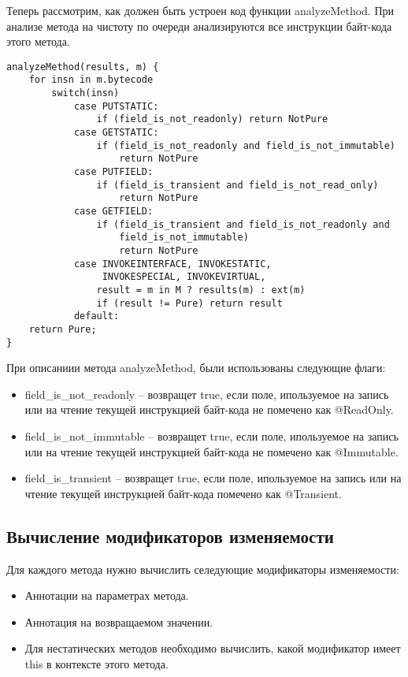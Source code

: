 Теперь рассмотрим, как должен быть устроен код функции analyzeMethod. При анализе метода на чистоту по очереди анализируются все инструкции байт-кода этого метода. 

\begin{lstlisting}[caption=Анализ чистоты методов, label=code:purity_analyze_method]
analyzeMethod(results, m) {
    for insn in m.bytecode 
		switch(insn) 
		    case PUTSTATIC:
		        if (field_is_not_readonly) return NotPure
		    case GETSTATIC:
		        if (field_is_not_readonly and field_is_not_immutable) 
		            return NotPure
		    case PUTFIELD:
		        if (field_is_transient and field_is_not_read_only) 
                    return NotPure
		    case GETFIELD:
		        if (field_is_transient and field_is_not_readonly and
		            field_is_not_immutable)        
		            return NotPure
		    case INVOKEINTERFACE, INVOKESTATIC, 
		         INVOKESPECIAL, INVOKEVIRTUAL, 
		        result = m in M ? results(m) : ext(m)
		        if (result != Pure) return result
		    default:       
    return Pure;        
}
\end{lstlisting}

При описаниии метода analyzeMethod, были использованы следующие флаги:
\begin{itemize}
\item field\_is\_not\_readonly -- возвращет true, если поле, ипользуемое на запись или на чтение текущей инструкцией байт-кода не помечено как @ReadOnly.
\item field\_is\_not\_immutable -- возвращет true, если поле, ипользуемое на запись или на чтение текущей инструкцией байт-кода не помечено как @Immutable.
\item field\_is\_transient -- возвращет true, если поле, ипользуемое на запись или на чтение текущей инструкцией байт-кода помечено как @Transient.
\end{itemize}

\subsection{Вычисление модификаторов изменяемости} 

Для каждого метода нужно вычислить селедующие модификаторы изменяемости:
\begin{itemize}
    \item Аннотации на параметрах метода.
    \item Аннотация на возвращаемом значении.
    \item Для нестатических методов необходимо вычислить, какой модификатор имеет this в контексте этого метода.
\end{itemize}

